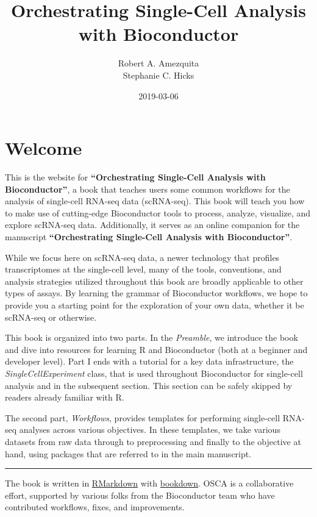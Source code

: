 \documentclass[]{book}
\title{Orchestrating Single-Cell Analysis with Bioconductor}
\author{Robert A. Amezquita \\ Stephanie C. Hicks}
\date{2019-03-06}
\begin{document}
\maketitle

{
\setcounter{tocdepth}{1}
\tableofcontents
}
\hypertarget{welcome}{%
\chapter*{Welcome}\label{welcome}}

This is the website for \textbf{``Orchestrating Single-Cell Analysis with Bioconductor''}, a book that teaches users some common workflows for the analysis of single-cell RNA-seq data (scRNA-seq). This book will teach you how to make use of cutting-edge Bioconductor tools to process, analyze, visualize, and explore scRNA-seq data. Additionally, it serves as an online companion for the manuscript \textbf{``Orchestrating Single-Cell Analysis with Bioconductor''}.

While we focus here on scRNA-seq data, a newer technology that profiles transcriptomes at the single-cell level, many of the tools, conventions, and analysis strategies utilized throughout this book are broadly applicable to other types of assays. By learning the grammar of Bioconductor workflows, we hope to provide you a starting point for the exploration of your own data, whether it be scRNA-seq or otherwise.

This book is organized into two parts. In the \emph{Preamble}, we introduce the book and dive into resources for learning R and Bioconductor (both at a beginner and developer level). Part I ends with a tutorial for a key data infrastructure, the \emph{SingleCellExperiment} class, that is used throughout Bioconductor for single-cell analysis and in the subsequent section. This section can be safely skipped by readers already familiar with R.

The second part, \emph{Workflows}, provides templates for performing single-cell RNA-seq analyses across various objectives. In these templates, we take various datasets from raw data through to preprocessing and finally to the objective at hand, using packages that are referred to in the main manuscript.

\begin{center}\rule{0.5\linewidth}{\linethickness}\end{center}

The book is written in \href{https://rmarkdown.rstudio.com}{RMarkdown} with \href{https://bookdown.org}{bookdown}. OSCA is a collaborative effort, supported by various folks from the Bioconductor team who have contributed workflows, fixes, and improvements.
\end{document}
